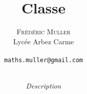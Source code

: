 


\lfoot[\thepage]{}
\rfoot[]{\thepage}




\title{\\ \medskip \medskip \large{Classe}}
\author{\textsc{Frédéric Muller}\\ \small{Lycée Arbez Carme}\\ \ \\
   \texttt{maths.muller@gmail.com}\\ \ \\
   }
\date{\vfill \flushleft \textit{Description}}

\maketitle


\clearpage{\pagestyle{empty}\cleardoublepage}
\setcounter{tocdepth}{1}
\tableofcontents
\thispagestyle{fancy}


